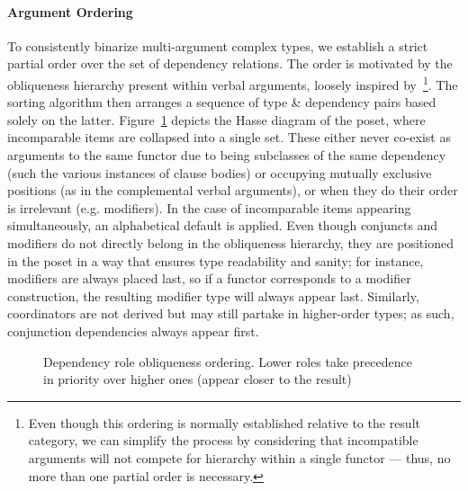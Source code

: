 \paragraph{Argument Ordering}
To consistently binarize multi-argument complex types, we establish a strict partial order over the set of dependency relations.
The order is motivated by the obliqueness hierarchy present within verbal arguments, loosely inspired by~\cite{dowty}\footnote{Even though this ordering is normally established relative to the result category, we can simplify the process by considering that incompatible arguments will not compete for hierarchy within a single functor --- thus, no more than one partial order is necessary.}.
The sorting algorithm then arranges a sequence of type \& dependency pairs based solely on the latter.
Figure~\ref{fig:lattice} depicts the Hasse diagram of the poset, where incomparable items are collapsed into a single set.
These either never co-exist as arguments to the same functor due to being subclasses of the same dependency (such the various instances of clause bodies) or occupying mutually exclusive positions (as in the complemental verbal arguments), or when they do their order is irrelevant (e.g. modifiers).
In the case of incomparable items appearing simultaneously, an alphabetical default is applied.
Even though conjuncts and modifiers do not directly belong in the obliqueness hierarchy, they are positioned in the poset in a way that ensures type readability and sanity; for instance, modifiers are always placed last, so if a functor corresponds to a modifier construction, the resulting modifier type will always appear last.
Similarly, coordinators are not derived but may still partake in higher-order types; as such, conjunction dependencies always appear first.

\begin{figure}
\centering
{}
    \caption[Dependency Role Obliqueness Ordering]{Dependency role obliqueness ordering. Lower roles take precedence in priority over higher ones (appear closer to the result)}
    \label{fig:lattice}
\end{figure}


